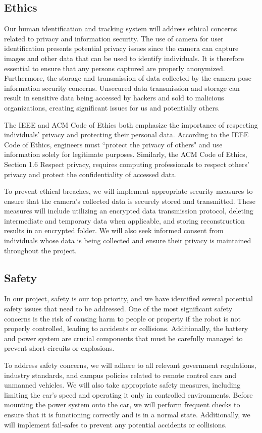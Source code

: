 \subsection{ Ethics }
Our human identification and tracking system will address ethical concerns related to privacy and information security. The use of camera for user identification presents potential privacy issues since the camera can capture images and other data that can be used to identify individuals. It is therefore essential to ensure that any persons captured are properly anonymized. Furthermore, the storage and transmission of data collected by the camera pose information security concerns. Unsecured data transmission and storage can result in sensitive data being accessed by hackers and sold to malicious organizations, creating significant issues for us and potentially others.

The IEEE and ACM Code of Ethics both emphasize the importance of respecting individuals' privacy and protecting their personal data. According to the IEEE Code of Ethics, engineers must ``protect the privacy of others" \cite{IEEEethics} and use information solely for legitimate purposes. Similarly, the ACM Code of Ethics, Section 1.6 Respect privacy, requires computing professionals to respect others’ privacy and protect the confidentiality of accessed data. 

To prevent ethical breaches, we will implement appropriate security measures to ensure that the camera’s collected data is securely stored and transmitted. These measures will include utilizing an encrypted data transmission protocol, deleting intermediate and temporary data when applicable, and storing reconstruction results in an encrypted folder. We will also seek informed consent from individuals whose data is being collected and ensure their privacy is maintained throughout the project.

\subsection{ Safety }
In our project, safety is our top priority, and we have identified several potential safety issues that need to be addressed. One of the most significant safety concerns is the risk of causing harm to people or property if the robot is not properly controlled, leading to accidents or collisions. Additionally, the battery and power system are crucial components that must be carefully managed to prevent short-circuits or explosions.

To address safety concerns, we will adhere to all relevant government regulations, industry standards, and campus policies related to remote control cars and unmanned vehicles. We will also take appropriate safety measures, including limiting the car’s speed and operating it only in controlled environments. Before mounting the power system onto the car, we will perform frequent checks to ensure that it is functioning correctly and is in a normal state. Additionally, we will implement fail-safes to prevent any potential accidents or collisions.